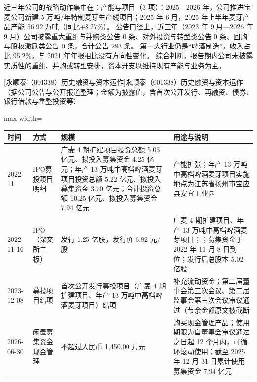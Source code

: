  近三年公司的战略动作集中在：产能与项目（3 项）：2025---2026 年，公司推进宝麦公司新建 5 万吨/年特制麦芽生产线项目；2025 年 6 月，2025 年上半年麦芽产品产能 56.92 万吨（同比+8.27\%）。 公告口径上，近三年（2023 年 9 月---2026 年 9 月）公司披露重大重组与并购类公告 0 条、对外投资与转型类公告 0 条、回购与股权激励类公告 0 条，合计公告 283 条。 第一大行业仍是“啤酒制造”，收入占比 95.2\%，与 2021 年年报相比没有方向性变化。 综合判断，报告期内公司未披露实质性的重组、并购或转型安排，资本开支以维持现有产能与业务为主。

\begin{center}\small\setlength{\tabcolsep}{4pt}
[永顺泰（001338）历史融资与资本运作]{永顺泰（001338）历史融资与资本运作（据公司公告与公开报道整理；金额为披露值，含首次公开发行、再融资、债券、银行借款与重整投资等）}
\begin{adjustbox}{max width=\textwidth}
\begin{tabular}{@{}p{1.45cm}p{2.55cm}p{4.05cm}p{4.95cm}@{}}
\toprule
时间 & 方式 & 规模 & 用途与说明 \\
\midrule
2022-11 & IPO募投项目明细 & 广麦 4 期扩建项目投资总额 5.03 亿元、\allowbreak{}拟投入募集资金 4.25 亿元；年产 13 万吨中高档啤酒麦芽项目投资总额 5.22 亿元、\allowbreak{}拟投入募集资金 3.70 亿元；合计投资总额 10.25 亿元、\allowbreak{}拟投入募集资金 7.94 亿元 & 产能扩张；年产 13 万吨中高档啤酒麦芽项目实施地点为江苏省扬州市宝应县安宜工业园 \\
2022-11-16 & IPO（深交所主板） & 发行 1.25 亿股，\allowbreak{}发行价 6.82 元/\allowbreak{}股 & 广麦 4 期扩建项目、\allowbreak{}年产 13 万吨中高档啤酒麦芽项目；；募集资金于 2022 年 11 月 8 日到位；发行后总股本 5.02 亿股 \\
2023-12-08 & 募投项目结项 & 首次公开发行募投项目（广麦 4 期扩建项目、\allowbreak{}年产 13 万吨中高档啤酒麦芽项目）结项 & 补充流动资金；第二届董事会第三次会议、\allowbreak{}第二届监事会第三次会议审议通过（节余金额原文被截断 \\
2026-06-30 & 闲置募集资金现金管理 & 不超过人民币 1,\allowbreak{}450.00 万元 & 购买现金管理产品；使用期限为自董事会审议通过之日起 12 个月内，\allowbreak{}可循环滚动使用；截至 2025 年 12 月 31 日累计使用募集资金 7.94 亿元 \\
\bottomrule
\end{tabular}
\end{adjustbox}
\end{center}

